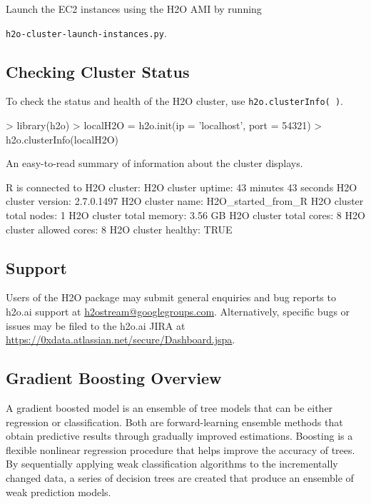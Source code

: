 \documentclass{article}[11pt]
\begin{document}
Launch the EC2 instances using the H2O AMI by running {\texttt{h2o-cluster-launch-instances.py}.


\subsection{Checking Cluster Status}


To check the status and health of the H2O cluster, use {\texttt{h2o.clusterInfo( )}}.
\begin{spverbatim}
> library(h2o)
> localH2O = h2o.init(ip = 'localhost', port = 54321)
> h2o.clusterInfo(localH2O)
\end{spverbatim}

An easy-to-read summary of information about the cluster displays. 
\begin{spverbatim}
R is connected to H2O cluster:
  H2O cluster uptime:         43 minutes 43 seconds
  H2O cluster version:        2.7.0.1497
  H2O cluster name:           H2O_started_from_R
  H2O cluster total nodes:    1
  H2O cluster total memory:   3.56 GB
  H2O cluster total cores:    8
  H2O cluster allowed cores:  8
  H2O cluster healthy:        TRUE
\end{spverbatim}

\noindent

\subsection{Support} 
Users of the H2O package may submit general enquiries and bug reports to h2o.ai support at {\url{h2ostream@googlegroups.com}}. Alternatively, specific bugs or issues may be filed to the h2o.ai JIRA at {\url{https://0xdata.atlassian.net/secure/Dashboard.jspa}}.

\subsection{Gradient Boosting Overview} 

A gradient boosted model is an ensemble of tree models that can be either regression or classification. Both are forward-learning ensemble methods that obtain predictive results through gradually improved estimations. Boosting is a flexible nonlinear regression procedure that helps improve the accuracy of trees. By sequentially applying weak classification algorithms to the incrementally changed data, a series of decision trees are created that produce an ensemble of weak prediction models.

}
\end{document}
